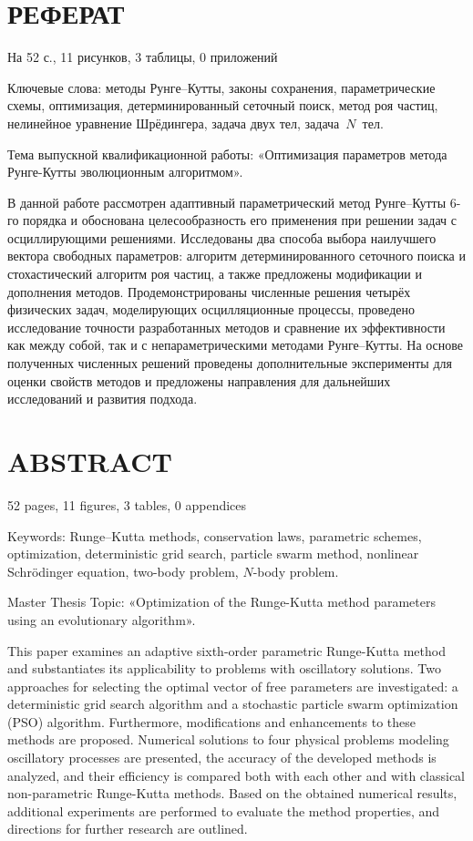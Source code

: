 \newpage
\pagestyle{empty}

\section*{\centering РЕФЕРАТ}
\onehalfspacing
На 52 с., 11 рисунков, 3 таблицы, 0 приложений

Ключевые слова: методы Рунге--Кутты, законы сохранения, параметрические схемы, оптимизация, детерминированный сеточный поиск, метод роя частиц, нелинейное уравнение Шрёдингера, задача двух тел, задача~$N$~тел.

Тема выпускной квалификационной работы: «Оптимизация параметров метода Рунге-Кутты эволюционным алгоритмом».

В данной работе рассмотрен адаптивный параметрический метод Рунге--Кутты 6-го порядка и обоснована целесообразность его применения при решении задач с осциллирующими решениями. Исследованы два способа выбора наилучшего вектора свободных параметров: алгоритм детерминированного сеточного поиска и стохастический алгоритм роя частиц, а также предложены модификации и дополнения методов. Продемонстрированы численные решения четырёх физических задач, моделирующих осцилляционные процессы, проведено исследование точности разработанных методов и сравнение их эффективности как между собой, так и с непараметрическими методами Рунге--Кутты. На основе полученных численных решений проведены дополнительные эксперименты для оценки свойств методов и предложены направления для дальнейших исследований и развития подхода.

\newpage
\pagestyle{empty}

\section*{\centering ABSTRACT}
\onehalfspacing

52 pages, 11 figures, 3 tables, 0 appendices

Keywords: Runge--Kutta methods, conservation laws, parametric schemes, optimization, deterministic grid search, particle swarm method, nonlinear Schrödinger equation, two-body problem, $N$-body problem.

Master Thesis Topic: «Optimization of the Runge-Kutta method parameters using an evolutionary algorithm».

This paper examines an adaptive sixth-order parametric Runge-Kutta method and substantiates its applicability to problems with oscillatory solutions. Two approaches for selecting the optimal vector of free parameters are investigated: a deterministic grid search algorithm and a stochastic particle swarm optimization (PSO) algorithm. Furthermore, modifications and enhancements to these methods are proposed. Numerical solutions to four physical problems modeling oscillatory processes are presented, the accuracy of the developed methods is analyzed, and their efficiency is compared both with each other and with classical non-parametric Runge-Kutta methods. Based on the obtained numerical results, additional experiments are performed to evaluate the method properties, and directions for further research are outlined.